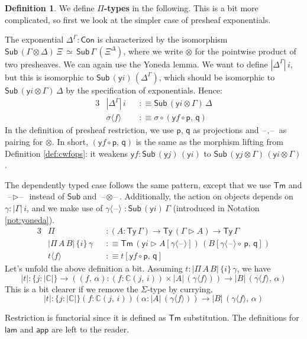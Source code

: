 \documentclass[12pt,a4paper,twoside,openany]{book}
\theoremstyle{remark}
\theoremstyle{definition}
\newtheorem{mydefinition}{Definition}
\theoremstyle{theorem}
\newcommand{\ms}[1]{\mathsf{#1}}
\newcommand{\mbb}[1]{\mathbb{#1}}
\newcommand{\Con}{\mathsf{Con}}
\newcommand{\Sub}{\mathsf{Sub}}
\newcommand{\Tm}{\mathsf{Tm}}
\newcommand{\Ty}{\mathsf{Ty}}
\newcommand{\blank}{\mathord{\hspace{1pt}\text{--}\hspace{1pt}}}
\newcommand{\ext}{\triangleright}
\newcommand{\p}{\mathsf{p}}
\newcommand{\q}{\mathsf{q}}
\newcommand{\app}{\ms{app}}
\newcommand{\mbbC}{\mbb{C}}
\newcommand{\lam}{\ms{lam}}
\newcommand{\lab}{\langle}
\newcommand{\rab}{\rangle}
\newcommand{\defn}{:\equiv}
\newcommand{\yon}{\ms{y}}
\begin{document}
\begin{mydefinition}
We define \textbf{$\Pi$-types} in the following. This is a bit more complicated,
so first we look at the simpler case of presheaf exponentials.

The exponential $\Delta^\Gamma : \Con$ is characterized by the isomorphism
$\Sub\,(\Gamma \otimes \Delta)\,\Xi\,\simeq\,\Sub\,\Gamma\,(\Xi^\Delta)$, where
we write $\otimes$ for the pointwise product of two presheaves. We can again use
the Yoneda lemma. We want to define $|\Delta^\Gamma|\,i$, but this is isomorphic
to $\Sub\,(\yon i)\,(\Delta^\Gamma)$, which should be isomorphic to $\Sub\,(\yon
i \otimes \Gamma)\,\Delta$ by the specification of exponentials. Hence:
\begin{alignat*}{3}
  &|\Delta^\Gamma|\,i &&\defn \Sub\,(\yon i \otimes \Gamma)\,\Delta \\
  & \sigma \lab f \rab &&\defn \sigma \circ (\yon f \circ \p,\,\q)
\end{alignat*}
In the definition of presheaf restriction, we use $\p$, $\q$ as projections and
$\blank\!,\!\blank$ as pairing for $\otimes$. In short, $(\yon f \circ \p,\,\q)$
is the same as the morphism lifting from Definition \ref{def:cwfops}: it weakens
$\yon f : \Sub\,(\yon j)\,(\yon i)$ to $\Sub\,(\yon j \otimes \Gamma)\,(\yon i
\otimes \Gamma)$.

The dependently typed case follows the same pattern, except that we use $\Tm$
and $\blank\!\ext\!\blank$ instead of $\Sub$ and
$\blank\!\otimes\!\blank$. Additionally, the action on objects depends on
$\gamma : |\Gamma|\,i$, and we make use of $\gamma \lab \blank \rab\,\,:
\Sub\,(\yon i)\,\Gamma$ (introduced in Notation \ref{not:yoneda}).
\begin{alignat*}{3}
  & \Pi &&: (A : \Ty\,\Gamma) \to \Ty\,(\Gamma \ext A) \to \Ty\,\Gamma\\
  & |\Pi\,A\,B|\,\{i\}\,\gamma &&\defn \Tm\,(\yon i \ext A[\gamma \lab \blank \rab])\,(B[\gamma\lab\blank\rab \circ\,\p,\,\q])\\
  & t\lab f \rab &&\defn t[\yon f \circ \p,\, \q]
\end{alignat*}
Let's unfold the above definition a bit. Assuming $t : |\Pi\,A\,B|\,\{i\}\,\gamma$, we have
\[
|t| : \{j : |\mbbC|\}\to((f,\,\alpha) : (f : \mbbC(j,\,i)) \times |A|\,(\gamma\lab f \rab)) \to
       |B|\,(\gamma\lab f\rab,\,\alpha)
\]
This is a bit clearer if we remove the $\Sigma$-type by currying.
\[
|t| : \{j : |\mbbC|\}(f : \mbbC(j,\,i))(\alpha : |A|\,(\gamma \lab f \rab)) \to
       |B|\,(\gamma\lab f \rab,\,\alpha)
\]

Restriction is functorial since it is defined as $\Tm$ substitution. The definitions
for $\lam$ and $\app$ are left to the reader.
\end{mydefinition}
\end{document}
